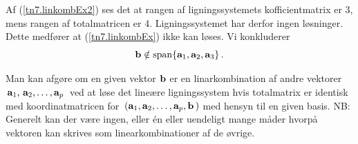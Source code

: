 Af (\ref{tn7.linkombEx2}) ses det at rangen af ligningssystemets kofficientmatrix er 3, mens rangen af totalmatricen er 4. Ligningssystemet har derfor ingen løsninger. Dette medfører at (\ref{tn7.linkombEx}) ikke kan løses. Vi konkluderer 
$$\mathbf{b} \notin \mathrm{span}\{\mathbf{a}_1,\mathbf{a}_2,\mathbf{a}_3\}\,.$$

\begin{method}[Linearkombination]\label{tn7.methLinKomb}
Man kan afgøre om en given vektor $\mathbf{b}$ er en linarkombination af andre vektorer $\,\mathbf{a}_1,\,\mathbf{a}_2,\ldots,\mathbf{a}_p\,$ ved at løse det lineære ligningssystem hvis totalmatrix er identisk med koordinatmatricen for $\,(\mathbf{a}_1,\mathbf{a}_2,\ldots,\mathbf{a}_p,\mathbf{b}\,)$ med hensyn til en given basis.\bs
NB: Generelt kan der være ingen, eller én eller uendeligt mange måder hvorpå vektoren kan skrives som linearkombinationer af de øvrige.
\end{method}

